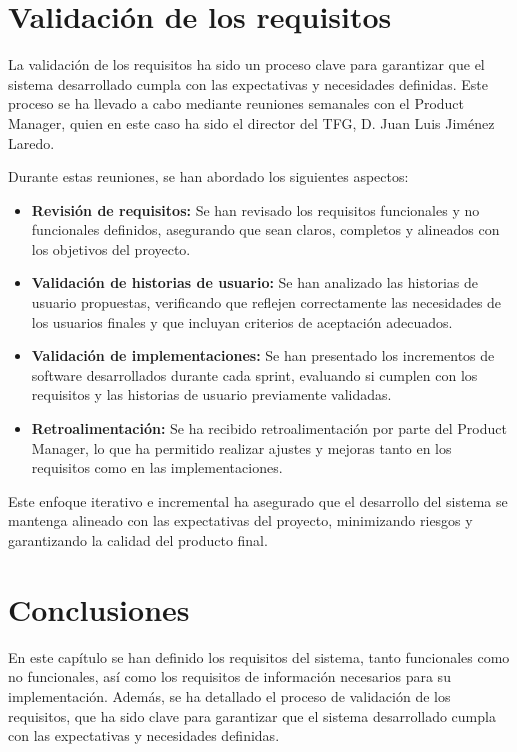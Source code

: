 \section{Validación de los requisitos}

La validación de los requisitos ha sido un proceso clave para garantizar que el sistema desarrollado cumpla con las expectativas y necesidades definidas. Este proceso se ha llevado a cabo mediante reuniones semanales con el Product Manager, quien en este caso ha sido el director del TFG, D. Juan Luis Jiménez Laredo.

Durante estas reuniones, se han abordado los siguientes aspectos:

\begin{itemize}
    \item \textbf{Revisión de requisitos:} Se han revisado los requisitos funcionales y no funcionales definidos, asegurando que sean claros, completos y alineados con los objetivos del proyecto.
    \item \textbf{Validación de historias de usuario:} Se han analizado las historias de usuario propuestas, verificando que reflejen correctamente las necesidades de los usuarios finales y que incluyan criterios de aceptación adecuados.
    \item \textbf{Validación de implementaciones:} Se han presentado los incrementos de software desarrollados durante cada sprint, evaluando si cumplen con los requisitos y las historias de usuario previamente validadas.
    \item \textbf{Retroalimentación:} Se ha recibido retroalimentación por parte del Product Manager, lo que ha permitido realizar ajustes y mejoras tanto en los requisitos como en las implementaciones.
\end{itemize}

Este enfoque iterativo e incremental ha asegurado que el desarrollo del sistema se mantenga alineado con las expectativas del proyecto, minimizando riesgos y garantizando la calidad del producto final.

\section{Conclusiones}

En este capítulo se han definido los requisitos del sistema, tanto funcionales como no funcionales, así como los requisitos de información necesarios para su implementación. Además, se ha detallado el proceso de validación de los requisitos, que ha sido clave para garantizar que el sistema desarrollado cumpla con las expectativas y necesidades definidas.

